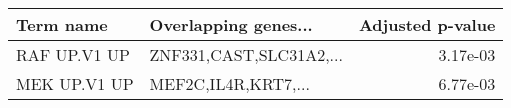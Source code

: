 \begin{tabular}{llr}
\toprule
   Term name &    Overlapping genes... &  Adjusted p-value \\
\midrule
RAF UP.V1 UP & ZNF331,CAST,SLC31A2,... &          3.17e-03 \\
MEK UP.V1 UP &     MEF2C,IL4R,KRT7,... &          6.77e-03 \\
\bottomrule
\end{tabular}
